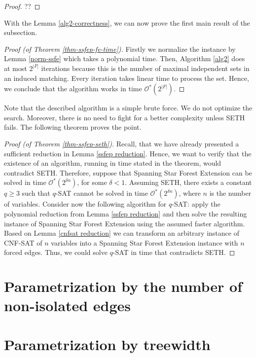 \documentclass[en]{pracamgr}
\newcommand{\ssfep}{{\sc Spanning Star Forest Extension}}
\newcommand{\cnfsat}{{\sc CNF-SAT}}
\begin{document}
\begin{proof}
	??
\end{proof}

With the Lemma \ref{alg2-correctness}, we can now prove the first main result of the subsection.

\begin{proof}[Proof (of Theorem \ref{thm-ssfep-fe-time})]
	Firstly we normalize the instance by Lemma \ref{norm-ssfe} which takes a polynomial time. Then, Algorithm \ref{alg2} does at most $2^{|F|}$ iterations because this is the number of maximal independent sets in an induced matching. Every iteration takes linear time to process the set. Hence, we conclude that the algorithm works in time $\mathcal{O}^*(2^{|F|})$.
\end{proof}

Note that the described algorithm is a simple brute force. We do not optimize the search. Moreover, there is no need to fight for a better complexity unless SETH fails. The following theorem proves the point.

\begin{proof}[Proof (of Theorem \ref{thm-ssfep-seth})]
	Recall, that we have already presented a sufficient reduction in Lemma \ref{ssfep reduction}. Hence, we want to verify that the existence of an algorithm, running in time stated in the theorem, would contradict SETH. Therefore, suppose that \ssfep{} can be solved in time $\mathcal{O}^*(2^{\delta n})$, for some $\delta < 1$. Assuming SETH, there exists a constant $q \geq 3$ such that $q${\sc -SAT} cannot be solved in time $\mathcal{O}^*(2^{\delta n})$, where $n$ is the number of variables. Consider now the following algorithm for $q${\sc -SAT}: apply the polynomial reduction from Lemma \ref{ssfep reduction} and then solve the resulting instance of \ssfep{} using the assumed faster algorithm. Based on Lemma \ref{cnfsat reduction} we can transform an arbitrary instance of \cnfsat{} of $n$ variables into a \ssfep{} instance with $n$ forced edges. Thus, we could solve $q${\sc -SAT} in time that contradicts SETH.
\end{proof}

\section{Parametrization by the number of non-isolated edges}

\section{Parametrization by treewidth}
\end{document}

